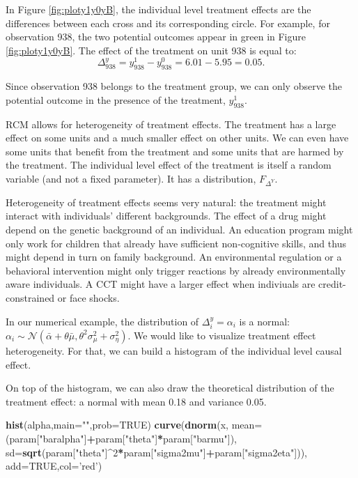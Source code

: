 \documentclass[]{book}
\newenvironment{Shaded}{\begin{snugshade}}{\end{snugshade}}
\newcommand{\KeywordTok}[1]{\textcolor[rgb]{0.13,0.29,0.53}{\textbf{#1}}}
\newcommand{\DataTypeTok}[1]{\textcolor[rgb]{0.13,0.29,0.53}{#1}}
\newcommand{\DecValTok}[1]{\textcolor[rgb]{0.00,0.00,0.81}{#1}}
\newcommand{\StringTok}[1]{\textcolor[rgb]{0.31,0.60,0.02}{#1}}
\newcommand{\OtherTok}[1]{\textcolor[rgb]{0.56,0.35,0.01}{#1}}
\newcommand{\OperatorTok}[1]{\textcolor[rgb]{0.81,0.36,0.00}{\textbf{#1}}}
\newcommand{\NormalTok}[1]{#1}
\theoremstyle{definition}
\theoremstyle{definition}
\theoremstyle{definition}
\theoremstyle{remark}
\let\BeginKnitrBlock\begin \let\EndKnitrBlock\end
\begin{document}
In Figure \ref{fig:ploty1y0yB}, the individual level treatment effects
are the differences between each cross and its corresponding circle. For
example, for observation 938, the two potential outcomes appear in green
in Figure \ref{fig:ploty1y0yB}. The effect of the treatment on unit 938
is equal to: \[
\Delta^y_{938}=y^1_{938}-y^0_{938}=6.01-5.95=0.05.
\]

Since observation 938 belongs to the treatment group, we can only
observe the potential outcome in the presence of the treatment,
\(y^1_{938}\).

RCM allows for heterogeneity of treatment effects. The treatment has a
large effect on some units and a much smaller effect on other units. We
can even have some units that benefit from the treatment and some units
that are harmed by the treatment. The individual level effect of the
treatment is itself a random variable (and not a fixed parameter). It
has a distribution, \(F_{\Delta^Y}\).

Heterogeneity of treatment effects seems very natural: the treatment
might interact with individuals' different backgrounds. The effect of a
drug might depend on the genetic background of an individual. An
education program might only work for children that already have
sufficient non-cognitive skills, and thus might depend in turn on family
background. An environmental regulation or a behavioral intervention
might only trigger reactions by already environmentally aware
individuals. A CCT might have a larger effect when indiviuals are
credit-constrained or face shocks.

\BeginKnitrBlock{example}
\protect\hypertarget{exm:unnamed-chunk-8}{}{\label{exm:unnamed-chunk-8} }In
our numerical example, the distribution of \(\Delta^y_i=\alpha_i\) is a
normal:
\(\alpha_i\sim\mathcal{N}(\bar{\alpha}+\theta\bar{\mu},\theta^2\sigma^2_{\mu}+\sigma^2_{\eta})\).
We would like to visualize treatment effect heterogeneity. For that, we
can build a histogram of the individual level causal effect.
\EndKnitrBlock{example} On top of the histogram, we can also draw the
theoretical distribution of the treatment effect: a normal with mean
0.18 and variance 0.05.

\begin{Shaded}
\begin{Highlighting}[]
\KeywordTok{hist}\NormalTok{(alpha,}\DataTypeTok{main=}\StringTok{""}\NormalTok{,}\DataTypeTok{prob=}\OtherTok{TRUE}\NormalTok{)}
\KeywordTok{curve}\NormalTok{(}\KeywordTok{dnorm}\NormalTok{(x, }\DataTypeTok{mean=}\NormalTok{(param[}\StringTok{"baralpha"}\NormalTok{]}\OperatorTok{+}\NormalTok{param[}\StringTok{"theta"}\NormalTok{]}\OperatorTok{*}\NormalTok{param[}\StringTok{"barmu"}\NormalTok{]), }\DataTypeTok{sd=}\KeywordTok{sqrt}\NormalTok{(param[}\StringTok{"theta"}\NormalTok{]}\OperatorTok{^}\DecValTok{2}\OperatorTok{*}\NormalTok{param[}\StringTok{"sigma2mu"}\NormalTok{]}\OperatorTok{+}\NormalTok{param[}\StringTok{"sigma2eta"}\NormalTok{])), }\DataTypeTok{add=}\OtherTok{TRUE}\NormalTok{,}\DataTypeTok{col=}\StringTok{'red'}\NormalTok{)}
\end{Highlighting}
\end{Shaded}
\end{document}
